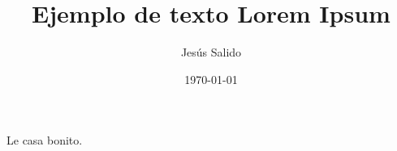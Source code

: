 \documentclass[11pt]{scrartcl}
\title{Ejemplo de texto Lorem Ipsum}
\author{Jesús Salido}
\date{\today}
\begin{document}
\maketitle
\blinddocument 

Le casa bonito.
\end{document}
